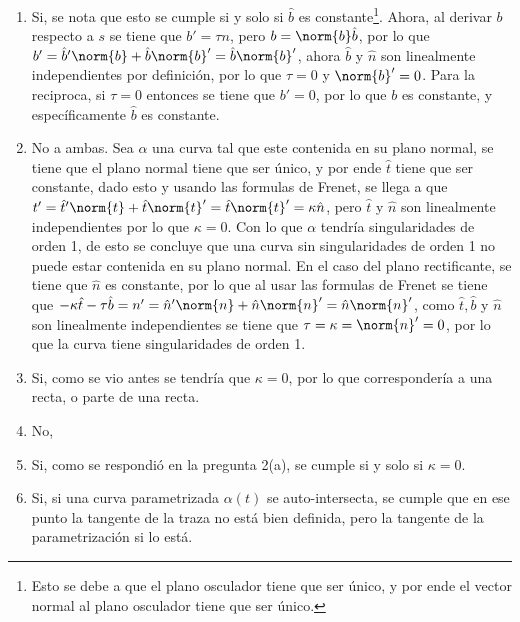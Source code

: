 \documentclass{homework}
\begin{document}
\begin{sol}
    \begin{enumerate}
        \item Si, se nota que esto se cumple si y solo si \(\hat{b}\) es constante\footnote{Esto se debe a que el plano osculador tiene que ser único, y por ende el vector normal al plano osculador tiene que ser único.}. Ahora, al derivar \(b\) respecto a \(s\) se tiene que \(b'=\tau n\), pero \(b=\norm{b}\hat{b}\), por lo que \(b'=\hat{b}'\norm{b}+\hat{b}\norm{b}'=\hat{b}\norm{b}'\), ahora \(\hat{b}\) y \(\hat{n}\) son linealmente independientes por definición, por lo que \(\tau=0\) y \(\norm{b}'=0\). Para la reciproca, si \(\tau=0\) entonces se tiene que \(b'=0\), por lo que \(b\) es constante, y específicamente \(\hat{b}\) es constante.
        \item No a ambas. Sea \(\alpha\) una curva tal que este contenida en su plano normal, se tiene que el plano normal tiene que ser único, y por ende \(\hat{t}\) tiene que ser constante, dado esto y usando las formulas de Frenet, se llega a que \(t'=\hat{t}'\norm{t}+\hat{t}\norm{t}'=\hat{t}\norm{t}'=\kappa \hat{n}\), pero \(\hat{t}\) y \(\hat{n}\) son linealmente independientes por lo que \(\kappa=0\). Con lo que \(\alpha\) tendría singularidades de orden 1, de esto se concluye que una curva sin singularidades de orden 1 no puede estar contenida en su plano normal. En el caso del plano rectificante, se tiene que \(\hat{n}\) es constante, por lo que al usar las formulas de Frenet se tiene que \(-\kappa \hat{t}-\tau \hat{b}=n'=\hat{n}'\norm{n}+\hat{n}\norm{n}'=\hat{n}\norm{n}'\), como \(\hat{t},\hat{b}\) y \(\hat{n}\) son linealmente independientes se tiene que \(\tau=\kappa=\norm{n}'=0\), por lo que la curva tiene singularidades de orden 1.
        \item Si, como se vio antes se tendría que \(\kappa=0\), por lo que correspondería a una recta, o parte de una recta.
        \item No, 
        \item Si, como se respondió en la pregunta 2(a), se cumple si y solo si \(\kappa=0\).
        \item Si, si una curva parametrizada \(\alpha(t)\) se auto-intersecta, se cumple que en ese punto la tangente de la traza no está bien definida, pero la tangente de la parametrización si lo está. 
    \end{enumerate}
\end{sol}
\end{document}
